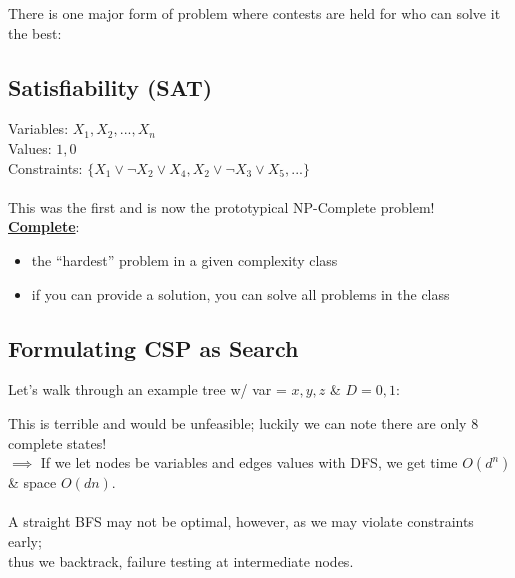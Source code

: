 \documentclass[../../lecture_notes.tex]{subfiles}
\begin{document}
\noindent There is one major form of problem where contests are held for who can solve it the best:

\subsection*{Satisfiability (SAT)}
	Variables: ${X_1, X_2, ..., X_n}$\\
	Values: ${1, 0}$\\
	Constraints: $\{X_1 \lor \neg X_2 \lor X_4, X_2 \lor \neg X_3 \lor X_5, ...\}$\\
\\
This was the first and is now the prototypical NP-Complete problem!\\
\textbf{\underline{Complete}}:
	\begin{itemize} [itemsep=0mm]
		\item the “hardest” problem in a given complexity class
		\item if you can provide a solution, you can solve all problems in the class
	\end{itemize}
	
\subsection*{Formulating CSP as Search}
\noindent Let’s walk through an example tree w/ var = ${x, y, z}$ \& $D = {0, 1}$:\\

\begin{center}  \end{center}
\noindent This is terrible and would be unfeasible; luckily we can note there are only 8 complete states!\\
$\implies$ If we let nodes be variables and edges values with DFS, we get time $O(d^n)$ \& space $O(dn)$.\\
\\
A straight BFS may not be optimal, however, as we may violate constraints early;\\
	\indent thus we backtrack, failure testing at intermediate nodes.\\
\end{document}
